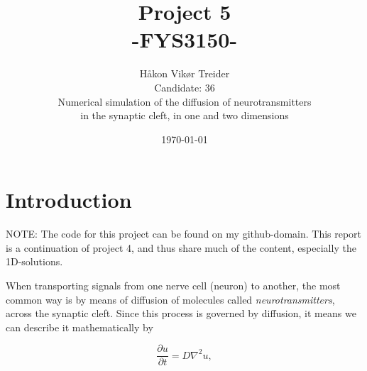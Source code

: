 \documentclass[11pt]{article}
\title{Project 5\\-FYS3150-}
\author{H\aa kon Vik\o r Treider\\Candidate: 36\\\small{Numerical simulation of the diffusion of neurotransmitters}\\\small{in the synaptic cleft, in one and two dimensions}}
\date{\today}
\begin{document}
\maketitle
\newpage

\section*{Introduction}
NOTE: The code for this project can be found on my github-domain. This report is a continuation of project 4, and thus share much of the content, especially the 1D-solutions.
\newline

When transporting signals from one nerve cell (neuron) to another, the most common way is by means of diffusion of molecules called \textit{neurotransmitters}, across the synaptic cleft. Since this process is governed by diffusion, it means we can describe it mathematically by

\begin{equation}
\frac{\partial u}{\partial t} = D \nabla^2 u,
\label{EQ1}
\end{equation}
\end{document}
